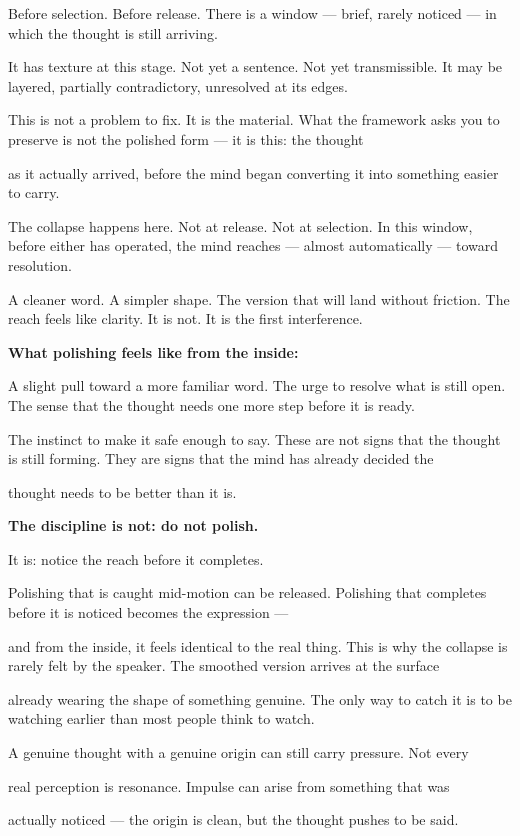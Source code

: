\documentclass[12pt, a4paper]{article}
\begin{document}
Before selection. Before release. There is a window --- brief, rarely noticed --- in which the thought is still arriving.

It has texture at this stage. Not yet a sentence. Not yet transmissible. It may be layered, partially contradictory, unresolved at its edges.

This is not a problem to fix. It is the material. What the framework asks you to preserve is not the polished form --- it is this: the thought

as it actually arrived, before the mind began converting it into something easier to carry.

The collapse happens here. Not at release. Not at selection. In this window, before either has operated, the mind reaches --- almost automatically --- toward resolution.

A cleaner word. A simpler shape. The version that will land without friction. The reach feels like clarity. It is not. It is the first interference.

\textbf{What polishing feels like from the inside:}

A slight pull toward a more familiar word. The urge to resolve what is still open. The sense that the thought needs one more step before it is ready.

The instinct to make it safe enough to say. These are not signs that the thought is still forming. They are signs that the mind has already decided the

thought needs to be better than it is.

\textbf{The discipline is not: do not polish.}

It is: notice the reach before it completes.

Polishing that is caught mid-motion can be released. Polishing that completes before it is noticed becomes the expression ---

and from the inside, it feels identical to the real thing. This is why the collapse is rarely felt by the speaker. The smoothed version arrives at the surface

already wearing the shape of something genuine. The only way to catch it is to be watching earlier than most people think to watch.

A genuine thought with a genuine origin can still carry pressure. Not every

real perception is resonance. Impulse can arise from something that was

actually noticed --- the origin is clean, but the thought pushes to be said.
\end{document}

